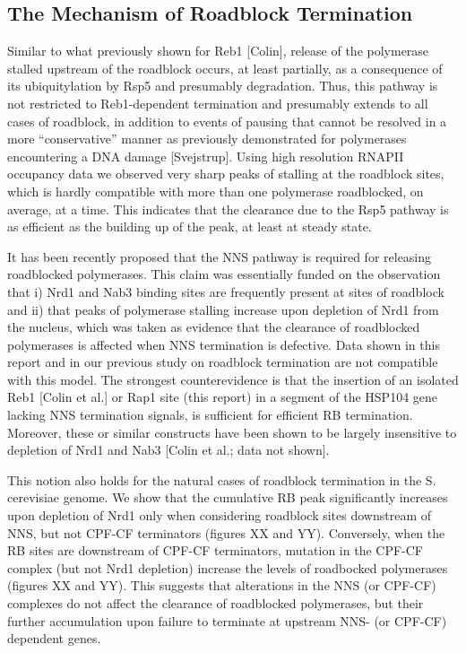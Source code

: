 \singlespacing
\subsection*{The Mechanism of Roadblock Termination}
\doublespacing

Similar to what previously shown for Reb1 [Colin], release of the polymerase stalled upstream of the roadblock occurs, at least partially, as a consequence of its ubiquitylation by Rsp5 and presumably degradation. Thus, this pathway is not restricted to Reb1-dependent termination and presumably extends to all cases of roadblock, in addition to events of pausing that cannot be resolved in a more “conservative” manner as previously demonstrated for polymerases encountering a DNA damage [Svejstrup]. Using high resolution RNAPII occupancy data we observed very sharp peaks of stalling at the roadblock sites, which is hardly compatible with more than one polymerase roadblocked, on average, at a time. This indicates that the clearance due to the Rsp5 pathway is as efficient as the building up of the peak, at least at steady state.

It has been recently proposed that the NNS pathway is required for releasing roadblocked polymerases. This claim was essentially funded on the observation that i) Nrd1 and Nab3 binding sites are frequently present at sites of roadblock and ii) that peaks of polymerase stalling increase upon depletion of Nrd1 from the nucleus, which was taken as evidence that the clearance of roadblocked polymerases is affected when NNS termination is defective. Data shown in this report and in our previous study on roadblock termination are not compatible with this model. The strongest counterevidence is that the insertion of an isolated Reb1 [Colin et al.] or Rap1 site (this report) in a segment of the HSP104 gene lacking NNS termination signals, is sufficient for efficient RB termination. Moreover, these or similar constructs have been shown to be largely insensitive to depletion of Nrd1 and Nab3 [Colin et al.; data not shown]. 

This notion also holds for the natural cases of roadblock termination in the S. cerevisiae genome. We show that the cumulative RB peak significantly increases upon depletion of Nrd1 only when considering roadblock sites downstream of NNS, but not CPF-CF terminators (figures XX and YY). Conversely, when the RB sites are downstream of CPF-CF terminators, mutation in the CPF-CF complex (but not Nrd1 depletion) increase the levels of roadbocked polymerases (figures XX and YY).  This suggests that alterations in the NNS (or CPF-CF) complexes do not affect the clearance of roadblocked polymerases, but their further accumulation upon failure to terminate at upstream NNS- (or CPF-CF) dependent genes. 

